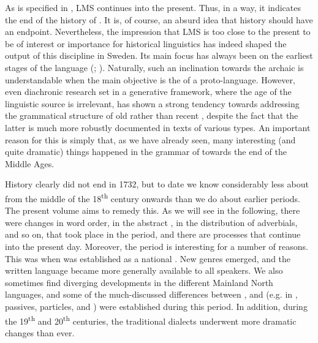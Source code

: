 \documentclass[output=paper]{langscibook}
\begin{document}
As is specified in , LMS continues into the present. Thus, in a way, it indicates the end of the history of . It is, of course, an absurd idea that history should have an endpoint. Nevertheless, the impression that LMS is too close to the present to be of interest or importance for historical linguistics has indeed shaped the output of this discipline in Sweden. Its main focus has always been on the earliest stages of the language (\citealt{Wollin1988}; \citealt{Haapamaki2010}). Naturally, such an inclination towards the archaic is understandable when the main objective is the  of a proto-language. However, even diachronic research set in a generative framework, where the age of the linguistic source is irrelevant, has shown a strong tendency towards addressing the grammatical structure of old rather than recent , despite the fact that the latter is much more robustly documented in texts of various types. An important reason for this is simply that, as we have already seen, many interesting (and quite dramatic) things happened in the grammar of  towards the end of the Middle Ages.



History clearly did not end in 1732, but to date we know considerably less about  from the middle of the 18\textsuperscript{th} century onwards than we do about earlier periods. The present volume aims to remedy this. As we will see in the following, there were changes in word order, in the abstract , in the distribution of adverbials, and so on, that took place in the  period, and there are  processes that continue into the present day. Moreover, the  period is interesting for a number of reasons. This was when  was established as a national . New genres emerged, and the written language became more generally available to all speakers. We also sometimes find diverging developments in the different Mainland North  languages, and some of the much-discussed differences between ,  and  (e.g. in , passives, particles, and ) were established during this period. In addition, during the 19\textsuperscript{th} and 20\textsuperscript{th} centuries, the traditional dialects underwent more dramatic changes than ever. 
\end{document}
